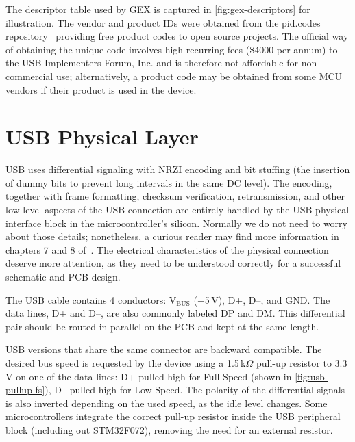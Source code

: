 The descriptor table used by GEX is captured in \cref{fig:gex-descriptors} for illustration. The vendor and product IDs were obtained from the pid.codes repository~\cite{pidcodes} providing free product codes to open source projects. The official way of obtaining the unique code involves high recurring fees (\$4000 per annum) to the USB Implementers Forum, Inc. and is therefore not affordable for non-commercial use; alternatively, a product code may be obtained from some \gls{MCU} vendors if their product is used in the device.
\newpage



\section{USB Physical Layer}

\gls{USB} uses differential signaling with \gls{NRZI} encoding and bit stuffing (the insertion of dummy bits to prevent long intervals in the same \gls{DC} level). The encoding, together with frame formatting, checksum verification, retransmission, and other low-level aspects of the \gls{USB} connection are entirely handled by the \gls{USB} physical interface block in the microcontroller's silicon. Normally we do not need to worry about those details; nonetheless, a curious reader may find more information in chapters 7 and 8 of~\cite{usbif-spec}. The electrical characteristics of the physical connection deserve more attention, as they need to be understood correctly for a successful schematic and \gls{PCB} design.

The \gls{USB} cable contains 4 conductors: V$_\mathrm{BUS}$ (+5\,V), D+, D--, and \gls{GND}. The data lines, D+ and D--, are also commonly labeled DP and DM. This differential pair should be routed in parallel on the \gls{PCB} and kept at the same length.

\gls{USB} versions that share the same connector are backward compatible. The desired bus speed is requested by the device using a 1.5\,k$\Omega$ pull-up resistor to 3.3\,V on one of the data lines: D+ pulled high for Full Speed (shown in \cref{fig:usb-pullup-fs}), D-- pulled high for Low Speed. The polarity of the differential signals is also inverted depending on the used speed, as the idle level changes. Some microcontrollers integrate the correct pull-up resistor inside the \gls{USB} peripheral block (including out STM32F072), removing the need for an external resistor.

